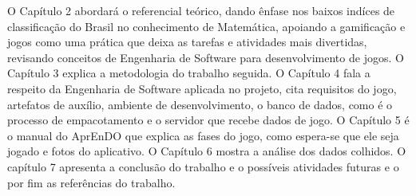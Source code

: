 O Capítulo 2 abordará o referencial teórico, dando ênfase nos baixos indíces de classificação do Brasil no conhecimento de Matemática, apoiando a gamificação e jogos como uma prática que deixa as tarefas e atividades mais divertidas, revisando conceitos de Engenharia de Software para desenvolvimento de jogos.
O Capítulo 3 explica a metodologia do trabalho seguida. O Capítulo 4 fala a respeito da Engenharia de Software aplicada no projeto, cita requisitos do jogo, artefatos de auxílio, ambiente de desenvolvimento, o banco de dados, como é o processo de empacotamento e o servidor que recebe dados de jogo. O Capítulo 5 é o manual do AprEnDO que explica as fases do jogo, como espera-se que ele seja jogado e fotos do aplicativo. O Capítulo 6 mostra a análise dos dados colhidos. O capítulo 7 apresenta a conclusão do trabalho e o possíveis atividades futuras e o por fim as referências do trabalho.
